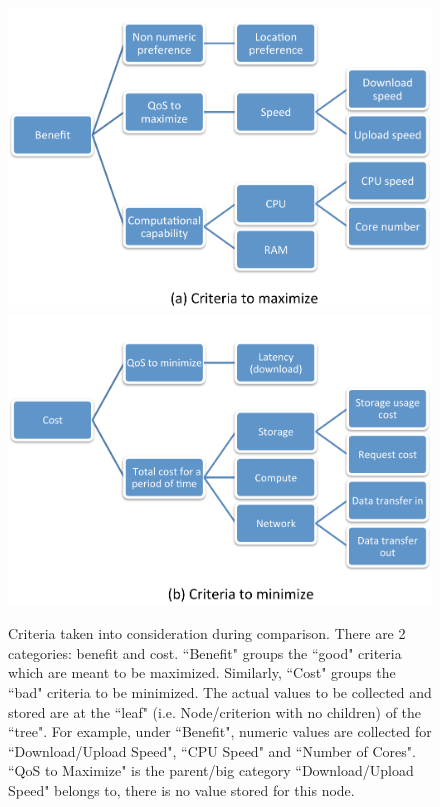 \begin{figure}[!ht]
 \centering
 \includegraphics[width=\textwidth,keepaspectratio]{Figures/AHP/figure4a.pdf}
  \includegraphics[width=\textwidth,keepaspectratio]{Figures/AHP/figure4b.pdf}
 \caption{ Criteria taken into consideration during comparison. There are 2 categories: benefit and cost. ``Benefit" groups the ``good" criteria which are meant to be maximized. Similarly, ``Cost" groups the ``bad" criteria to be minimized. The actual values to be collected and stored are at the ``leaf" (i.e. Node/criterion with no children) of the ``tree". For example, under ``Benefit", numeric values are collected for ``Download/Upload Speed", ``CPU Speed" and ``Number of Cores". ``QoS to Maximize" is the parent/big category ``Download/Upload Speed" belongs to, there is no value stored for this node.}
\label{fig4}
\end{figure}

